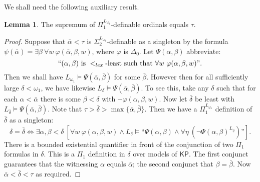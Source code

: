 \documentclass[a4paper,11pt]{amsart}
\theoremstyle{definition}
\newtheorem{lemma}[fact]{Lemma}
\newtheorem*{problem A}{Problem 1}
\newtheorem*{problem B}{Problem 2}
\theoremstyle{remark}
\begin{document}
We shall need the following auxiliary result. 

\begin{lemma} 
\label{tau is the sup of Pi1-definable ordinals} 
The supremum of $\Pi_1^{L_{\omega_1}}$-definable ordinals equals $\tau$. 
\end{lemma} 
\begin{proof} 
Suppose that $\bar{\alpha}<\tau$ is $\Sigma_2^{L_{\omega_1}}$-definable as a singleton by the formula $\psi(\bar{\alpha}) = \exists \beta\ \forall w\ \varphi(\bar{\alpha},\beta,w)$, where $\varphi$ is $\Delta_0$. 
Let $\Psi(\alpha,\beta)$ abbreviate: 
{\em
$$ ``(\alpha,\beta) \text{ is } <_{lex}\text{-least such that }\forall w\ \varphi(\alpha,\beta,w)".$$} 
Then we shall have $L_{\omega_{1}}\models \Psi(\bar{\alpha},\bar{\beta})$ for some $\bar{\beta}$. 
However then for all sufficiently large $\delta < \omega_{1}$, we have likewise 
$L_{\delta}\models \Psi(\bar{\alpha},\bar{\beta})$. 
To see this, take any $\delta$ such that for each $\alpha<\bar{\alpha}$ there is some $\beta<\delta$ with $\neg\varphi(\alpha,\beta,w)$. 
Now let $\bar{\delta}$ be least with $L_{\bar{\delta}}\models \Psi(\bar{\alpha},\bar{\beta})$. 
Note that $\tau > \bar{\delta}>\max\{\bar{\alpha},\bar{\beta}\}$. 
Then we have  a $\Pi_{1}^{L_{\omega_{1}}}$ definition of $\bar{\delta}$ as a singleton:
$$\delta= \bar{\delta} \Longleftrightarrow \exists \alpha,\beta<\delta\ [\forall w\ \varphi(\alpha,\beta,w)\wedge L_{\delta}\models \mbox{``}\Psi(\alpha,\beta)\wedge \forall \eta\ (\neg\Psi(\alpha,\beta)^{L_{\eta}})\mbox{''} ].$$%
There is a bounded existential quantifier in front of the conjunction of two $\Pi_1$ formulas in $\delta$. 
This is a $\Pi_1$ definition in $\delta$ over models of $\mathsf{KP}$. 
The first conjunct guarantees that the witnessing $\alpha$ equals $\bar{\alpha}$; the second conjunct that $\beta = \bar{\beta}$.
Now $\bar{\alpha}<\bar{\delta}<\tau$ as required. 
\end{proof} 
\end{document}
